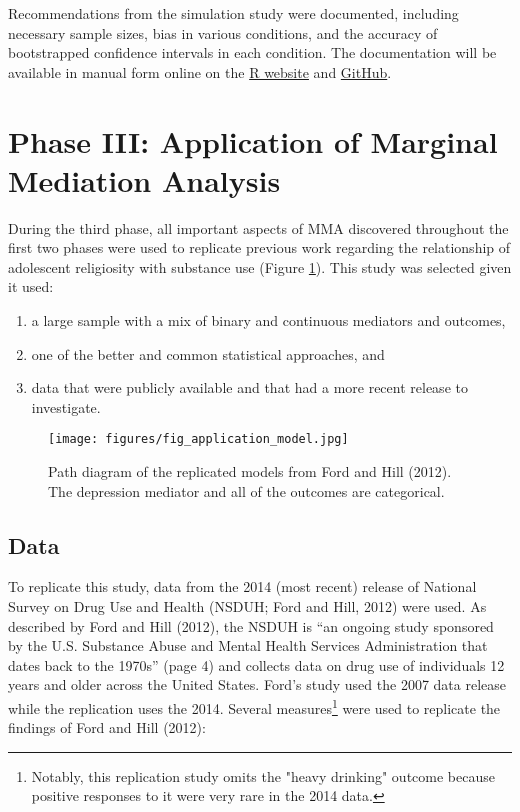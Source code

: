 \documentclass[]{DissertateUSU}
\providecommand{\tightlist}{%
  \setlength{\itemsep}{0pt}\setlength{\parskip}{0pt}}
\let\rmarkdownfootnote\footnote%
\def\footnote{\protect\rmarkdownfootnote}
\begin{document}
Recommendations from the simulation study were documented, including
necessary sample sizes, bias in various conditions, and the accuracy of
bootstrapped confidence intervals in each condition. The documentation
will be available in manual form online on the
\href{http://www.r-project.org}{R website} and
\href{github.com}{GitHub}.

\section{Phase III: Application of Marginal Mediation
Analysis}\label{phase-iii-application-of-marginal-mediation-analysis}

During the third phase, all important aspects of MMA discovered
throughout the first two phases were used to replicate previous work
regarding the relationship of adolescent religiosity with substance use
(Figure \ref{fig:theorymed}). This study was selected given it used:

\begin{enumerate}
\def\labelenumi{\arabic{enumi}.}
\tightlist
\item
  a large sample with a mix of binary and continuous mediators and
  outcomes,
\item
  one of the better and common statistical approaches, and
\item
  data that were publicly available and that had a more recent release
  to investigate.
\end{enumerate}

\begin{figure}[tb]
  \texttt{[image: figures/fig\_application\_model.jpg]}
  \caption{Path diagram of the replicated models from Ford and Hill (2012). The depression mediator and all of the outcomes are categorical.}
  \label{fig:theorymed}
\end{figure}

\subsection{Data}\label{data}

To replicate this study, data from the 2014 (most recent) release of
National Survey on Drug Use and Health (NSDUH; Ford and Hill, 2012) were
used. As described by Ford and Hill (2012), the NSDUH is ``an ongoing
study sponsored by the U.S. Substance Abuse and Mental Health Services
Administration that dates back to the 1970s'' (page 4) and collects data
on drug use of individuals 12 years and older across the United States.
Ford's study used the 2007 data release while the replication uses the
2014. Several
measures\footnote{Notably, this replication study omits the "heavy drinking" outcome because positive responses to it were very rare in the 2014 data.}
were used to replicate the findings of Ford and Hill (2012):
\end{document}
